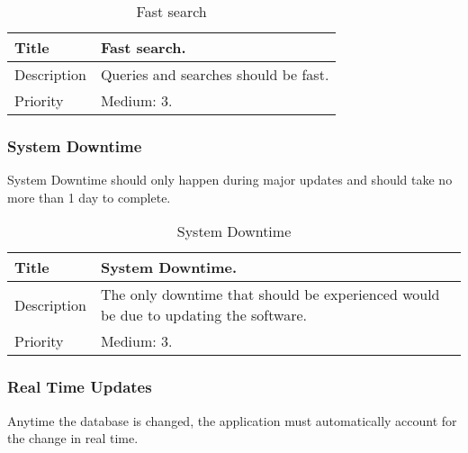   \begin{table}[h!]
    \caption{Fast search}
    \label{system-requirements/non-functional/fast-search}
    \begin{tabularx}{\textwidth}{|l|X|}
      \hline
      Title           & Fast search. \\ \hline
      Description     & Queries and searches should be fast.\\ \hline
      Priority        & Medium: 3. \\ \hline
    \end{tabularx}
  \end{table}

\subsubsection{System Downtime}
  System Downtime should only happen during major updates and should take
 no more than 1 day to complete.

  \begin{table}[h!]
    \caption{System Downtime}
    \label{system-requirements/non-functional/system-downtime}
    \begin{tabularx}{\textwidth}{|l|X|}
      \hline
      Title           & System Downtime. \\ \hline
      Description     & The only downtime that should be experienced would be
			 due to updating the software.\\ \hline
      Priority        & Medium: 3. \\ \hline
    \end{tabularx}
  \end{table}

\subsubsection{Real Time Updates}
  Anytime the database is changed, the application must automatically
  account for the change in real time.


